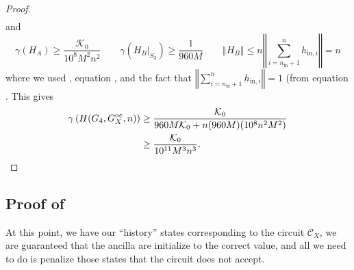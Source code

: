 \documentclass[../thesis-main/thesis-main]{subfiles}
\begin{document}
\begin{proof}
\begin{align}
\end{align}
and
\begin{equation}
  \gamma(H_{A}) \geq \frac{\mathcal{K}_0}{10^8 M^{2}n^{2}} \qquad
  \gamma(H_{B}|_{S_{3}})\geq\frac{1}{960M} \qquad 
  \left\Vert H_{B}\right\Vert 
    \leq n\left\Vert \sum_{i=n_{\text{in}}+1}^{n}h_{\text{in},i}\right\Vert = n
\end{equation}
where we used , equation , and the fact that $\left\Vert \sum_{i=n_{\text{in}}+1}^{n}h_{\text{in},i}\right\Vert =1$ (from equation . This gives
\begin{align}
\gamma \left(H(G_4,G_X^{\text{oc}},n)\right)
&\geq \frac{\mathcal{K}_0}{960M\mathcal{K}_0+n(960M)(10^8n^2M^2)} \\
& \geq \frac{\mathcal{K}_0}{10^{11} M^3n^3}. \qedhere
\end{align}
\end{proof}

\subsection{Proof of }

At this point, we have our ``history'' states corresponding to the circuit $\mathcal{C}_X$, we are guaranteed that the ancilla are initialize to the correct value, and all we need to do is penalize those states that the circuit does not accept.  
\end{document}

